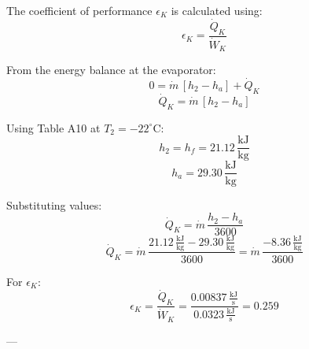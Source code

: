 The coefficient of performance \( \epsilon_K \) is calculated using:  
\[
\epsilon_K = \frac{\dot{Q}_K}{\dot{W}_K}
\]  

From the energy balance at the evaporator:  
\[
0 = \dot{m} \, [h_2 - h_a] + \dot{Q}_K
\]  
\[
\dot{Q}_K = \dot{m} \, [h_2 - h_a]
\]  

Using Table A10 at \( T_2 = -22^\circ\text{C} \):  
\[
h_2 = h_f = 21.12 \, \frac{\text{kJ}}{\text{kg}}
\]  
\[
h_a = 29.30 \, \frac{\text{kJ}}{\text{kg}}
\]  

Substituting values:  
\[
\dot{Q}_K = \dot{m} \, \frac{h_2 - h_a}{\text{3600}}
\]  
\[
\dot{Q}_K = \dot{m} \, \frac{21.12 \, \frac{\text{kJ}}{\text{kg}} - 29.30 \, \frac{\text{kJ}}{\text{kg}}}{\text{3600}} = \dot{m} \, \frac{-8.36 \, \frac{\text{kJ}}{\text{kg}}}{\text{3600}}
\]  

For \( \epsilon_K \):  
\[
\epsilon_K = \frac{\dot{Q}_K}{\dot{W}_K} = \frac{0.00837 \, \frac{\text{kJ}}{\text{s}}}{0.0323 \, \frac{\text{kJ}}{\text{s}}} = 0.259
\]  

---
